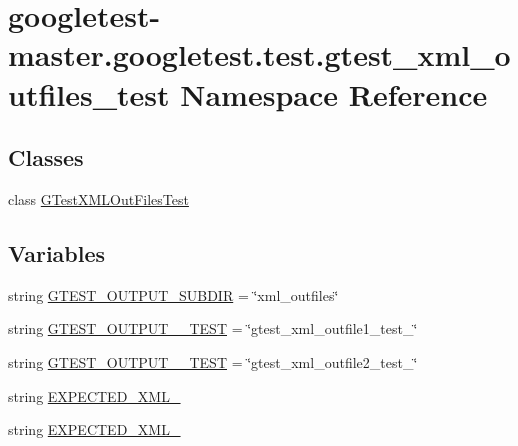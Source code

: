 \hypertarget{namespacegoogletest-master_1_1googletest_1_1test_1_1gtest__xml__outfiles__test}{}\section{googletest-\/master.googletest.\+test.\+gtest\+\_\+xml\+\_\+outfiles\+\_\+test Namespace Reference}
\label{namespacegoogletest-master_1_1googletest_1_1test_1_1gtest__xml__outfiles__test}
\subsection*{Classes}
\begin{DoxyCompactItemize}
\item 
class \mbox{\hyperlink{classgoogletest-master_1_1googletest_1_1test_1_1gtest__xml__outfiles__test_1_1_g_test_x_m_l_out_files_test}{G\+Test\+X\+M\+L\+Out\+Files\+Test}}
\end{DoxyCompactItemize}
\subsection*{Variables}
\begin{DoxyCompactItemize}
\item 
string \mbox{\hyperlink{namespacegoogletest-master_1_1googletest_1_1test_1_1gtest__xml__outfiles__test_afba756d34be3d8239e6f5175f5048672}{G\+T\+E\+S\+T\+\_\+\+O\+U\+T\+P\+U\+T\+\_\+\+S\+U\+B\+D\+IR}} = \char`\"{}xml\+\_\+outfiles\char`\"{}
\item 
string \mbox{\hyperlink{namespacegoogletest-master_1_1googletest_1_1test_1_1gtest__xml__outfiles__test_a91e8f1e875a8289d7be93462edecb1fa}{G\+T\+E\+S\+T\+\_\+\+O\+U\+T\+P\+U\+T\+\_\+\_\+\+T\+E\+ST}} = \char`\"{}gtest\+\_\+xml\+\_\+outfile1\+\_\+test\+\_\+\char`\"{}
\item 
string \mbox{\hyperlink{namespacegoogletest-master_1_1googletest_1_1test_1_1gtest__xml__outfiles__test_a18e45e2741c8f08801a6bca16ef5d064}{G\+T\+E\+S\+T\+\_\+\+O\+U\+T\+P\+U\+T\+\_\+\_\+\+T\+E\+ST}} = \char`\"{}gtest\+\_\+xml\+\_\+outfile2\+\_\+test\+\_\+\char`\"{}
\item 
string \mbox{\hyperlink{namespacegoogletest-master_1_1googletest_1_1test_1_1gtest__xml__outfiles__test_ab1e16abee0cb58fb7242f8c4f6d306a8}{E\+X\+P\+E\+C\+T\+E\+D\+\_\+\+X\+M\+L\+\_}}
\item 
string \mbox{\hyperlink{namespacegoogletest-master_1_1googletest_1_1test_1_1gtest__xml__outfiles__test_a8103ee3053cc81a14445bace13373644}{E\+X\+P\+E\+C\+T\+E\+D\+\_\+\+X\+M\+L\+\_}}
\end{DoxyCompactItemize}



